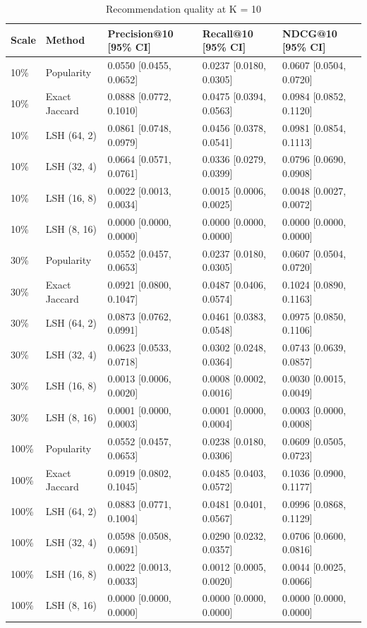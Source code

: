 \begin{table}[ht]\centering
\caption{Recommendation quality at K = 10}
\begin{tabular}{lllll}
\hline
Scale & Method & Precision@10 [95\% CI] & Recall@10 [95\% CI] & NDCG@10 [95\% CI] \\
\hline
10\% & Popularity & 0.0550 [0.0455, 0.0652] & 0.0237 [0.0180, 0.0305] & 0.0607 [0.0504, 0.0720] \\
10\% & Exact Jaccard & 0.0888 [0.0772, 0.1010] & 0.0475 [0.0394, 0.0563] & 0.0984 [0.0852, 0.1120] \\
10\% & LSH (64, 2) & 0.0861 [0.0748, 0.0979] & 0.0456 [0.0378, 0.0541] & 0.0981 [0.0854, 0.1113] \\
10\% & LSH (32, 4) & 0.0664 [0.0571, 0.0761] & 0.0336 [0.0279, 0.0399] & 0.0796 [0.0690, 0.0908] \\
10\% & LSH (16, 8) & 0.0022 [0.0013, 0.0034] & 0.0015 [0.0006, 0.0025] & 0.0048 [0.0027, 0.0072] \\
10\% & LSH (8, 16) & 0.0000 [0.0000, 0.0000] & 0.0000 [0.0000, 0.0000] & 0.0000 [0.0000, 0.0000] \\
30\% & Popularity & 0.0552 [0.0457, 0.0653] & 0.0237 [0.0180, 0.0305] & 0.0607 [0.0504, 0.0720] \\
30\% & Exact Jaccard & 0.0921 [0.0800, 0.1047] & 0.0487 [0.0406, 0.0574] & 0.1024 [0.0890, 0.1163] \\
30\% & LSH (64, 2) & 0.0873 [0.0762, 0.0991] & 0.0461 [0.0383, 0.0548] & 0.0975 [0.0850, 0.1106] \\
30\% & LSH (32, 4) & 0.0623 [0.0533, 0.0718] & 0.0302 [0.0248, 0.0364] & 0.0743 [0.0639, 0.0857] \\
30\% & LSH (16, 8) & 0.0013 [0.0006, 0.0020] & 0.0008 [0.0002, 0.0016] & 0.0030 [0.0015, 0.0049] \\
30\% & LSH (8, 16) & 0.0001 [0.0000, 0.0003] & 0.0001 [0.0000, 0.0004] & 0.0003 [0.0000, 0.0008] \\
100\% & Popularity & 0.0552 [0.0457, 0.0653] & 0.0238 [0.0180, 0.0306] & 0.0609 [0.0505, 0.0723] \\
100\% & Exact Jaccard & 0.0919 [0.0802, 0.1045] & 0.0485 [0.0403, 0.0572] & 0.1036 [0.0900, 0.1177] \\
100\% & LSH (64, 2) & 0.0883 [0.0771, 0.1004] & 0.0481 [0.0401, 0.0567] & 0.0996 [0.0868, 0.1129] \\
100\% & LSH (32, 4) & 0.0598 [0.0508, 0.0691] & 0.0290 [0.0232, 0.0357] & 0.0706 [0.0600, 0.0816] \\
100\% & LSH (16, 8) & 0.0022 [0.0013, 0.0033] & 0.0012 [0.0005, 0.0020] & 0.0044 [0.0025, 0.0066] \\
100\% & LSH (8, 16) & 0.0000 [0.0000, 0.0000] & 0.0000 [0.0000, 0.0000] & 0.0000 [0.0000, 0.0000] \\
\hline
\end{tabular}
\end{table}
